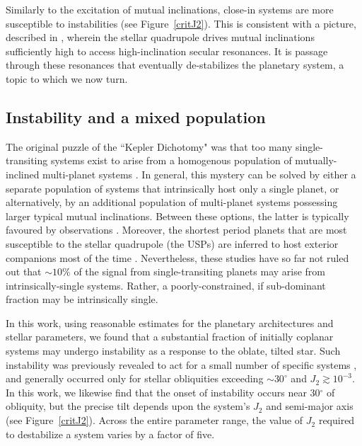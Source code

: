 \documentclass[twocolumn]{aastex63}
\begin{document}
Similarly to the excitation of mutual inclinations, close-in systems are more susceptible to instabilities (see Figure~\ref{critJ2}). This is consistent with a picture, described in \citet{spalding2018resilience}, wherein the stellar quadrupole drives mutual inclinations sufficiently high to access high-inclination secular resonances. It is passage through these resonances that eventually de-stabilizes the planetary system, a topic to which we now turn. 

\subsection{Instability and a mixed population}

The original puzzle of the ``Kepler Dichotomy" was that too many single-transiting systems exist to arise from a homogenous population of mutually-inclined multi-planet systems \citep{johansen2012can,ballard2016kepler,he2019architectures}. In general, this mystery can be solved by either a separate population of systems that intrinsically host only a single planet, or alternatively, by an additional population of multi-planet systems possessing larger typical mutual inclinations. Between these options, the latter is typically favoured by observations \citep{zhu201830,he2019architectures}. Moreover, the shortest period planets that are most susceptible to the stellar quadrupole (the USPs) are inferred to host exterior companions most of the time \citep{sanchis2014study,adams2020ultra}. Nevertheless, these studies have so far not ruled out that $\sim10\%$ of the signal from single-transiting planets may arise from intrinsically-single systems. Rather, a poorly-constrained, if sub-dominant fraction may be intrinsically single. 

In this work, using reasonable estimates for the planetary architectures and stellar parameters, we found that a substantial fraction of initially coplanar systems may undergo instability as a response to the oblate, tilted star. Such instability was previously revealed to act for a small number of specific systems \citep{spalding2018resilience}, and generally occurred only for stellar obliquities exceeding $\sim 30^\circ$ and $J_2\gtrsim 10^{-3}$. In this work, we likewise find that the onset of instability occurs near 30$^\circ$ of obliquity, but the precise tilt depends upon the system's $J_2$ and semi-major axis (see Figure~\ref{critJ2}). Across the entire parameter range, the value of $J_2$ required to destabilize a system varies by a factor of five.
\end{document}
